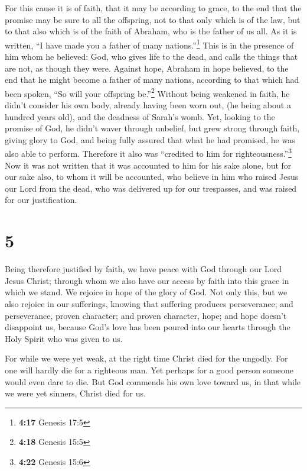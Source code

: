  For this cause it is of faith, that it may be according
to grace, to the end that the promise may be sure to all the offspring,
not to that only which is of the law, but to that also which is of the
faith of Abraham, who is the father of us all.  As it is
written, ``I have made you a father of many nations.''\footnote{\textbf{4:17}
  Genesis 17:5} This is in the presence of him whom he believed: God,
who gives life to the dead, and calls the things that are not, as though
they were.  Against hope, Abraham in hope believed, to
the end that he might become a father of many nations, according to that
which had been spoken, ``So will your offspring be.''\footnote{\textbf{4:18}
  Genesis 15:5}  Without being weakened in faith, he
didn't consider his own body, already having been worn out, (he being
about a hundred years old), and the deadness of Sarah's womb.
 Yet, looking to the promise of God, he didn't waver
through unbelief, but grew strong through faith, giving glory to God,
 and being fully assured that what he had promised, he
was also able to perform.  Therefore it also was
``credited to him for righteousness.''\footnote{\textbf{4:22} Genesis
  15:6}  Now it was not written that it was accounted to
him for his sake alone,  but for our sake also, to whom
it will be accounted, who believe in him who raised Jesus our Lord from
the dead,  who was delivered up for our trespasses, and
was raised for our justification.

\hypertarget{section-4}{%
\section{5}\label{section-4}}

 Being therefore justified by faith, we have peace with
God through our Lord Jesus Christ;  through whom we also
have our access by faith into this grace in which we stand. We rejoice
in hope of the glory of God.  Not only this, but we also
rejoice in our sufferings, knowing that suffering produces perseverance;
 and perseverance, proven character; and proven character,
hope;  and hope doesn't disappoint us, because God's love
has been poured into our hearts through the Holy Spirit who was given to
us.

 For while we were yet weak, at the right time Christ died
for the ungodly.  For one will hardly die for a righteous
man. Yet perhaps for a good person someone would even dare to die.
 But God commends his own love toward us, in that while we
were yet sinners, Christ died for us.

